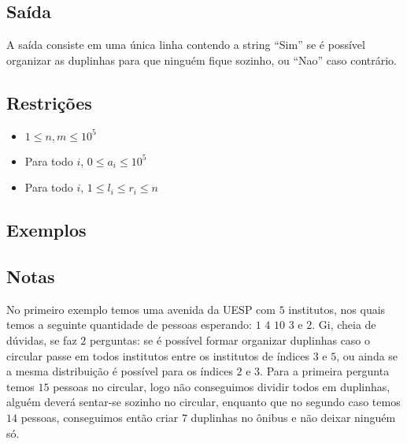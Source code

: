 \subsection*{Saída}

A saída consiste em uma única linha contendo a string ``Sim'' se é possível organizar as duplinhas para que ninguém fique sozinho, ou ``Nao'' caso contrário.


\subsection*{Restrições}
\begin{itemize}
	\item $1 \leq n, m \leq 10^5$
	\item Para todo $i$, $0 \leq a_i \leq 10^5$
	\item Para todo $i$, $1 \leq l_i \leq r_i \leq n$
\end{itemize}

\subsection*{Exemplos}


\subsection*{Notas}
No primeiro exemplo temos uma avenida da UESP com $5$ institutos, nos quais temos a seguinte quantidade de pessoas esperando: $1$ $4$ $10$ $3$ e $2$. Gi, cheia de dúvidas, se faz $2$ perguntas: se é possível formar organizar duplinhas caso o circular passe em todos institutos entre os institutos de índices $3$ e $5$, ou ainda se a mesma distribuição é possível para os índices $2$ e $3$. Para a primeira pergunta temos $15$ pessoas no circular, logo não conseguimos dividir todos em duplinhas, alguém deverá sentar-se sozinho no circular, enquanto que no segundo caso temos $14$ pessoas, conseguimos então criar $7$ duplinhas no ônibus e não deixar ninguém só.
